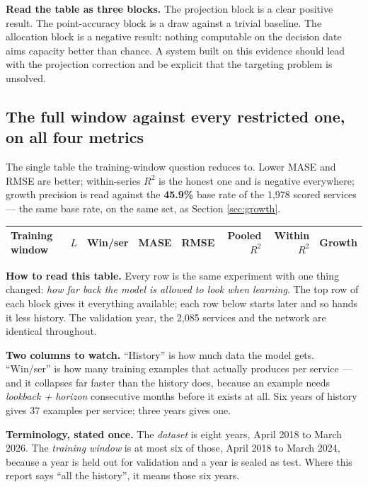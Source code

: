 \documentclass[11pt,a4paper]{article}
\newcommand{\keypoint}[1]{%
  \par\vspace{0.4em}%
  \noindent\colorbox{fed!8}{\parbox{0.98\textwidth}{\vspace{0.2em}#1\vspace{0.2em}}}%
  \par\vspace{0.4em}}
\begin{document}
\keypoint{\textbf{Read the table as three blocks.} The projection block is a clear positive result. The
point-accuracy block is a draw against a trivial baseline. The allocation block is a negative result:
nothing computable on the decision date aims capacity better than chance. A system built on this
evidence should lead with the projection correction and be explicit that the targeting problem is
unsolved.}

\subsection{The full window against every restricted one, on all four metrics}

The single table the training-window question reduces to. Lower MASE and RMSE are better; within-series
$R^2$ is the honest one and is negative everywhere; growth precision is read against the
\textbf{45.9\%} base rate of the 1{,}978 scored services --- the same base rate, on the same set,
as Section \ref{sec:growth}.

\begin{center}
\footnotesize
\begin{tabular}{@{}llrrrrrr@{}}
\toprule
\textbf{Training window} & \textbf{$L$} & \textbf{Win/ser} & \textbf{MASE} & \textbf{RMSE} & \textbf{Pooled $R^2$} & \textbf{Within $R^2$} & \textbf{Growth} \\
\midrule
\bottomrule
\end{tabular}
\end{center}

\keypoint{\textbf{How to read this table.} Every row is the same experiment with one thing changed:
\emph{how far back the model is allowed to look when learning}. The top row of each block gives it
everything available; each row below starts later and so hands it less history. The validation year,
the 2,085 services and the network are identical throughout.

\textbf{Two columns to watch.} ``History'' is how much data the model gets. ``Win/ser'' is how many
training examples that actually produces per service --- and it collapses far faster than the history
does, because an example needs \emph{lookback + horizon} consecutive months before it exists at all.
Six years of history gives 37 examples per service; three years gives one.}

\textbf{Terminology, stated once.} The \emph{dataset} is eight years, April 2018 to March 2026. The
\emph{training window} is at most six of those, April 2018 to March 2024, because a year is held out
for validation and a year is sealed as test. Where this report says ``all the history'', it means those
six years.
\end{document}
